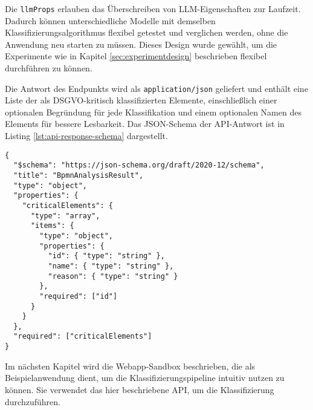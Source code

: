 Die \texttt{llmProps} erlauben das Überschreiben von \ac{LLM}-Eigenschaften zur Laufzeit. Dadurch können unterschiedliche Modelle mit demselben Klassifizierungsalgorithmus flexibel getestet und verglichen werden, ohne die Anwendung neu starten zu müssen. Dieses Design wurde gewählt, um die Experimente wie in Kapitel \ref{sec:experimentdesign} beschrieben flexibel durchführen zu können.

Die Antwort des Endpunkts wird als \texttt{application/json} geliefert und enthält eine Liste der als \ac{DSGVO}-kritisch klassifizierten Elemente, einschließlich einer optionalen Begründung für jede Klassifikation und einem optionalen Namen des Elements für bessere Lesbarkeit. Das JSON-Schema der API-Antwort ist in Listing \ref{lst:api-response-schema} dargestellt.

\begin{lstlisting}[caption={JSON-Schema der API-Antwort.},label={lst:api-response-schema}]
{
  "$schema": "https://json-schema.org/draft/2020-12/schema",
  "title": "BpmnAnalysisResult",
  "type": "object",
  "properties": {
    "criticalElements": {
      "type": "array",
      "items": {
        "type": "object",
        "properties": {
          "id": { "type": "string" },
          "name": { "type": "string" },
          "reason": { "type": "string" }
        },
        "required": ["id"]
      }
    }
  },
  "required": ["criticalElements"]
}
\end{lstlisting}

Im nächsten Kapitel wird die Webapp-Sandbox beschrieben, die als Beispielanwendung dient, um die Klassifizierungspipeline intuitiv nutzen zu können. Sie verwendet das hier beschriebene API, um die Klassifizierung durchzuführen.